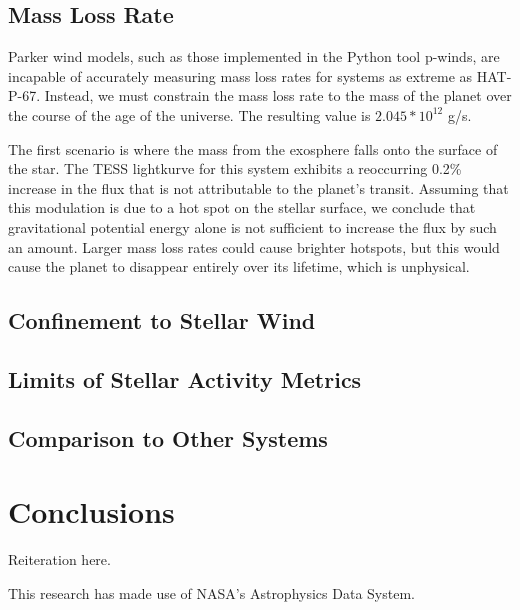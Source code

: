 \documentclass[modern]{aastex631}
\begin{document}
\subsection{Mass Loss Rate}
Parker wind models, such as those implemented in the Python tool p-winds, are incapable of accurately measuring mass loss rates for systems as extreme as HAT-P-67. Instead, we must constrain the mass loss rate to the mass of the planet over the course of the age of the universe. The resulting value is $2.045*10^{12}$ g/s. 

The first scenario is where the mass from the exosphere falls onto the surface of the star. The TESS lightkurve for this system exhibits a reoccurring 0.2\% increase in the flux that is not attributable to the planet’s transit. Assuming that this modulation is due to a hot spot on the stellar surface, we conclude that gravitational potential energy alone is not sufficient to increase the flux by such an amount. Larger mass loss rates could cause brighter hotspots, but this would cause the planet to disappear entirely over its lifetime, which is unphysical.

\subsection{Confinement to Stellar Wind}
\subsection{Limits of Stellar Activity Metrics}
\subsection{Comparison to Other Systems}
\section{Conclusions}

Reiteration here.

\clearpage
\pagebreak


\appendix


\begin{acknowledgements}
    This research has made use of NASA's Astrophysics Data System.
\end{acknowledgements}
\end{document}
